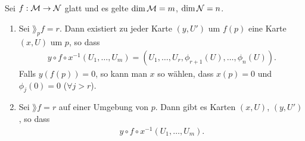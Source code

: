 \begin{satz}
\label{satz:Satz über implizite Funtionen}
\end{satz}
Sei $f: \mathcal{M} \to \mathcal{N}$ glatt und es gelte $\dim\mathcal{M}=m$, $\dim{\mathcal{N}} = n$.
\begin{enumerate}
\item Sei $\rang_p f = r$. 
Dann existiert zu jeder Karte  $(y, U')$ um $f(p)$ eine Karte $(x, U)$ um $p$, so dass
\begin{align}
y \circ f \circ x^{-1}(U_1, \dots, U_m) = (U_1, \dots, U_r, \phi_{r+1}(U), \dots, \phi_n(U)).
\end{align}
Falls $y(f(p))=0$, so kann man $x$ so wählen, dass $x(p)=0$ und $\phi_j (0) = 0$ ($\forall j > r$).

\item Sei $\rang f = r$ auf einer Umgebung von $p$.
Dann gibt es Karten $(x, U)$, $(y, U')$, so dass 
\begin{align}
y\circ f \circ x^{-1} (U_1, \dots, U_m).
\end{align}

\end{enumerate}
